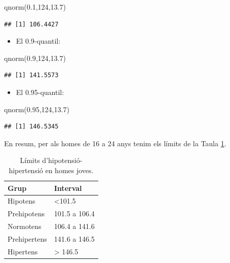 \documentclass[
]{book}
\newenvironment{Shaded}{\begin{snugshade}}{\end{snugshade}}
\newcommand{\DecValTok}[1]{\textcolor[rgb]{0.00,0.00,0.81}{#1}}
\newcommand{\FloatTok}[1]{\textcolor[rgb]{0.00,0.00,0.81}{#1}}
\newcommand{\FunctionTok}[1]{\textcolor[rgb]{0.00,0.00,0.00}{#1}}
\newcommand{\NormalTok}[1]{#1}
\providecommand{\tightlist}{%
  \setlength{\itemsep}{0pt}\setlength{\parskip}{0pt}}
\theoremstyle{definition}
\theoremstyle{definition}
\theoremstyle{definition}
\theoremstyle{remark}
\begin{document}
\begin{Shaded}
\begin{Highlighting}[]
\FunctionTok{qnorm}\NormalTok{(}\FloatTok{0.1}\NormalTok{,}\DecValTok{124}\NormalTok{,}\FloatTok{13.7}\NormalTok{)}
\end{Highlighting}
\end{Shaded}

\begin{verbatim}
## [1] 106.4427
\end{verbatim}

\begin{itemize}
\tightlist
\item
  El 0.9-quantil:
\end{itemize}

\begin{Shaded}
\begin{Highlighting}[]
\FunctionTok{qnorm}\NormalTok{(}\FloatTok{0.9}\NormalTok{,}\DecValTok{124}\NormalTok{,}\FloatTok{13.7}\NormalTok{)}
\end{Highlighting}
\end{Shaded}

\begin{verbatim}
## [1] 141.5573
\end{verbatim}

\begin{itemize}
\tightlist
\item
  El 0.95-quantil:
\end{itemize}

\begin{Shaded}
\begin{Highlighting}[]
\FunctionTok{qnorm}\NormalTok{(}\FloatTok{0.95}\NormalTok{,}\DecValTok{124}\NormalTok{,}\FloatTok{13.7}\NormalTok{)}
\end{Highlighting}
\end{Shaded}

\begin{verbatim}
## [1] 146.5345
\end{verbatim}

En resum, per als homes de 16 a 24 anys tenim els límits de la Taula \ref{tab:tensio}.

\begin{table}

\caption{\label{tab:tensio}Límits d'hipotensió-hipertensió en homes joves.}
\centering
\begin{tabular}[t]{l|l}
\hline
Grup & Interval\\
\hline
Hipotens & <101.5\\
\hline
Prehipotens & 101.5 a 106.4\\
\hline
Normotens & 106.4 a 141.6\\
\hline
Prehipertens & 141.6 a 146.5\\
\hline
Hipertens & > 146.5\\
\hline
\end{tabular}
\end{table}
\end{document}
